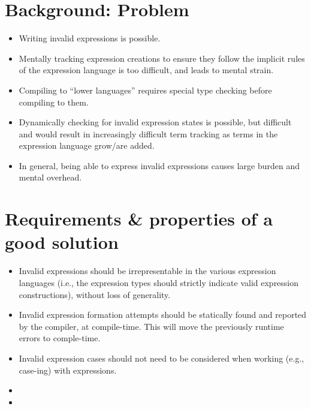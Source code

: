\section{Background: Problem}

\begin{itemize}
    
    \item Writing invalid expressions is possible.
    
    \item Mentally tracking expression creations to ensure they follow the
          implicit rules of the expression language is too difficult, and leads
          to mental strain.

    \item Compiling to ``lower languages'' requires special type checking before
          compiling to them. 
    
    \item Dynamically checking for invalid expression states is possible, but
          difficult and would result in increasingly difficult term tracking as
          terms in the expression language grow/are added.

    \item In general, being able to express invalid expressions causes large
          burden and mental overhead.
    
\end{itemize}


\section{Requirements \& properties of a good solution}

\begin{itemize}
    
    \item Invalid expressions should be irrepresentable in the various expression
          languages (i.e., the expression types should strictly indicate valid
          expression constructions), without loss of generality.
    
    \item Invalid expression formation attempts should be statically found and
          reported by the compiler, at compile-time. This will move the
          previously runtime errors to comple-time.

    \item Invalid expression cases should not need to be considered when working
          (e.g., case-ing) with expressions.

    \item {}
    
    \item {}

\end{itemize}

